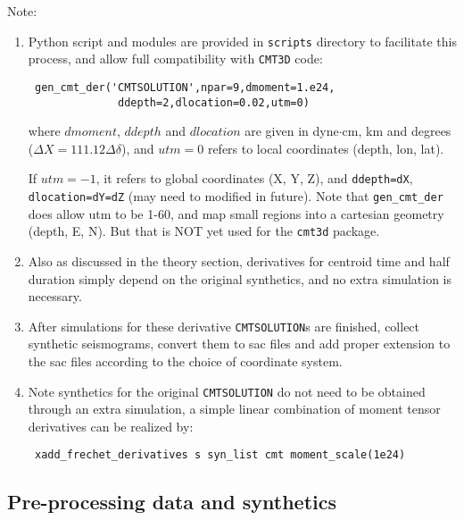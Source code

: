 \documentclass[12pt,titlepage,fleqn]{article}
\begin{document}
Note:
\begin{enumerate}
\item
Python script and modules are provided in \verb+scripts+ directory to facilitate this process, and allow full compatibility with \verb+CMT3D+ code:
\begin{verbatim}
 gen_cmt_der('CMTSOLUTION',npar=9,dmoment=1.e24,
              ddepth=2,dlocation=0.02,utm=0)
\end{verbatim}
where $dmoment$, $ddepth$ and $dlocation$ are given in dyne$\cdot$cm, km and degrees ($\Delta X=111.12\Delta \delta $), and $utm=0$ refers to local coordinates  (depth, lon, lat).

If $utm=-1$, it refers to global coordinates (X, Y, Z), and \verb+ddepth=dX+, \verb+dlocation=dY=dZ+ (may need to modified in future).
Note that \verb+gen_cmt_der+ does allow utm to be 1-60, and map  small regions into a cartesian geometry (depth, E, N). But that is NOT yet used for the \verb+cmt3d+ package.
\item Also as discussed in the theory section, derivatives for centroid time and half duration simply depend on the original synthetics, and  no extra simulation is necessary. 
\item After simulations for these derivative \verb+CMTSOLUTION+s are finished, collect synthetic seismograms, convert them to sac files and add proper extension to the sac files according to the choice of coordinate system.

\item Note synthetics for the original \verb+CMTSOLUTION+ do not need to be obtained through an extra simulation, a simple linear combination of moment tensor derivatives can be realized by:
\begin{verbatim}
 xadd_frechet_derivatives s syn_list cmt moment_scale(1e24)
\end{verbatim}

\end{enumerate}

\subsection{Pre-processing data and synthetics}
\end{document}
